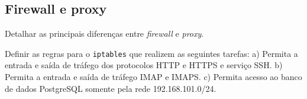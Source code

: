 \subsection*{Firewall e proxy}

\exercise Detalhar as principais diferenças entre {\em firewall} e
{\em proxy}.\par

\exercise Definir as regras para o {\tt iptables} que realizem as
seguintes tarefas: a) Permita a entrada e saída de tráfego dos
protocolos HTTP e HTTPS e serviço SSH. b) Permita a entrada e saída de
tráfego IMAP e IMAPS. c) Permita acesso ao banco de dados PostgreSQL
somente pela rede 192.168.101.0/24. \par